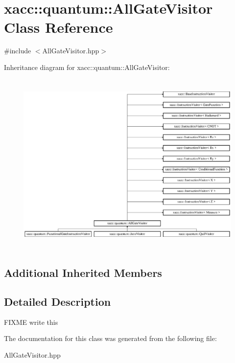 \hypertarget{a00033}{}\section{xacc\+:\+:quantum\+:\+:All\+Gate\+Visitor Class Reference}
\label{a00033}


{\ttfamily \#include $<$All\+Gate\+Visitor.\+hpp$>$}

Inheritance diagram for xacc\+:\+:quantum\+:\+:All\+Gate\+Visitor\+:\begin{figure}[H]
\begin{center}
\leavevmode
\includegraphics[height=9.201878cm]{a00033}
\end{center}
\end{figure}
\subsection*{Additional Inherited Members}


\subsection{Detailed Description}
F\+I\+X\+ME write this 

The documentation for this class was generated from the following file\+:\begin{DoxyCompactItemize}
\item 
All\+Gate\+Visitor.\+hpp\end{DoxyCompactItemize}
